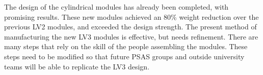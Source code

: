 \documentclass{aiaa-tc}%
\begin{document}
The design of the cylindrical modules has already been completed, with promising results. These new modules achieved an 80\% weight reduction over the previous LV2 modules, and exceeded the design strength. 
The present method of manufacturing the new LV3 modules is effective, but needs refinement. There are many steps that rely on the skill of the people assembling the modules. These steps need to be modified so that future PSAS groups and outside university teams will be able to replicate the LV3 design. 
\end{document}
